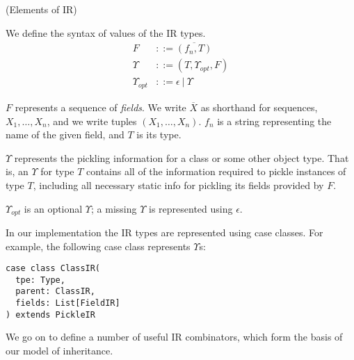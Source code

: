 \begin{defn}{(Elements of IR)}
\label{def:elems-ir}

We define the syntax of values of the IR types.
\vspace{-0.3em}
\begin{align*}
F&        ::= \overline{(f_n, T)}\\
\Upsilon&       ::= (T, \Upsilon_{opt}, F)\\
\Upsilon_{opt}& ::= \epsilon~|~\Upsilon
\end{align*}

$F$ represents a sequence of \textit{fields}. We write $\overline{X}$ as
shorthand for sequences, $X_1,\dots,X_n$, and we write tuples
$(X_1,\dots,X_n)$. $f_n$ is a string representing the name of the given field,
and $T$ is its type.

$\Upsilon$ represents the pickling information for a class or some other object
type. That is, an $\Upsilon$ for type $T$ contains all of the information required
to pickle instances of type $T$, including all necessary static info for
pickling its fields provided by $F$.

$\Upsilon_{opt}$ is an optional $\Upsilon$; a missing $\Upsilon$ is represented using $\epsilon$.
\end{defn}

\noindent In our implementation the IR types are represented using case classes. For
example, the following case class represents $\Upsilon$s:


\begin{lstlisting}
case class ClassIR(
  tpe: Type,
  parent: ClassIR,
  fields: List[FieldIR]
) extends PickleIR
\end{lstlisting}

We go on to define a number of useful IR combinators, which form the
basis of our model of inheritance.



\vspace{1em}

